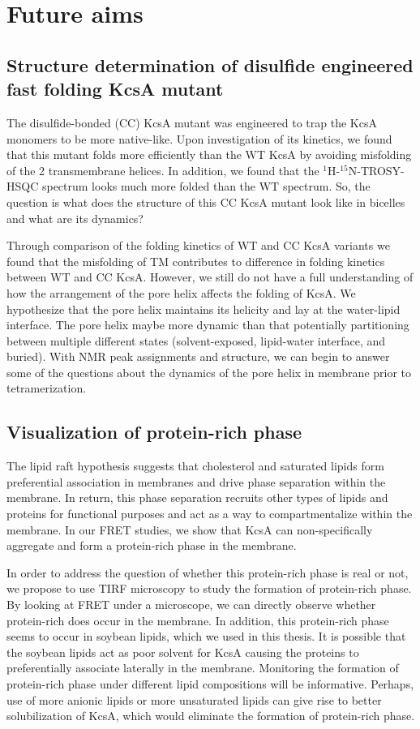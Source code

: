 \section{Future aims}
\subsection{Structure determination of disulfide engineered fast folding KcsA mutant}
The disulfide-bonded (CC) KcsA mutant was engineered to trap the KcsA monomers to be more native-like. Upon investigation of its kinetics, we found that this mutant folds more efficiently than the WT KcsA by avoiding misfolding of the 2 transmembrane helices. In addition, we found that the $^{1}$H-$^{15}$N-TROSY-HSQC spectrum looks much more folded than the WT spectrum. So, the question is what does the structure of this CC KcsA mutant look like in bicelles and what are its dynamics?

Through comparison of the folding kinetics of WT and CC KcsA variants we found that the misfolding of TM contributes to difference in folding kinetics between WT and CC KcsA. However, we still do not have a full understanding of how the arrangement of the pore helix affects the folding of KcsA. We hypothesize that the pore helix maintains its helicity and lay at the water-lipid interface. The pore helix maybe more dynamic than that potentially partitioning between multiple different states (solvent-exposed, lipid-water interface, and buried). With NMR peak assignments and structure, we can begin to answer some of the questions about the dynamics of the pore helix in membrane prior to tetramerization.

\subsection{Visualization of protein-rich phase}
The lipid raft hypothesis suggests that cholesterol and saturated lipids form preferential association in membranes and drive phase separation within the membrane. In return, this phase separation recruits other types of lipids and proteins for functional purposes and act as a way to compartmentalize within the membrane. In our FRET studies, we show that KcsA can non-specifically aggregate and form a protein-rich phase in the membrane.

In order to address the question of whether this protein-rich phase is real or not, we propose to use TIRF microscopy to study the formation of protein-rich phase. By looking at FRET under a microscope, we can directly observe whether protein-rich does occur in the membrane. In addition, this protein-rich phase seems to occur in soybean lipids, which we used in this thesis. It is possible that the soybean lipids act as poor solvent for KcsA causing the proteins to preferentially associate laterally in the membrane. Monitoring the formation of protein-rich phase under different lipid compositions will be informative. Perhaps, use of more anionic lipids or more unsaturated lipids can give rise to better solubilization of KcsA, which would eliminate the formation of protein-rich phase.

